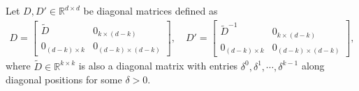 \documentclass[11 pt]{article}
\begin{document}
\begin{itemize}
		
		
		Let $D,D'\in\mathbb{R}^{d\times d}$ be diagonal matrices defined as
		\begin{align*}
			D=\begin{bmatrix}
				\tilde{D} & 0_{k\times (d-k)}\\
				0_{(d-k)\times k} & 0_{(d-k)\times (d-k)} 
			\end{bmatrix},\quad  D'=\begin{bmatrix}
				\tilde{D}^{-1} & 0_{k\times (d-k)}\\
				0_{(d-k)\times k} & 0_{(d-k)\times (d-k)} 
			\end{bmatrix},
		\end{align*} 
		where $\tilde{D}\in\mathbb{R}^{k\times k}$ is also a diagonal matrix with entries $\delta^0, \delta^1, \cdots, \delta^{k-1}$ along diagonal positions for some $\delta > 0$. 
		

\end{itemize}
\end{document}
